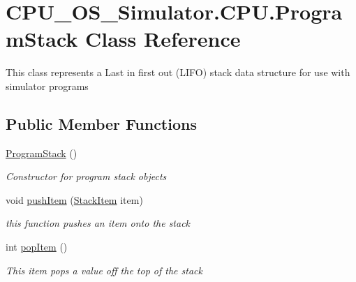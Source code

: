 \hypertarget{class_c_p_u___o_s___simulator_1_1_c_p_u_1_1_program_stack}{}\section{C\+P\+U\+\_\+\+O\+S\+\_\+\+Simulator.\+C\+P\+U.\+Program\+Stack Class Reference}
\label{class_c_p_u___o_s___simulator_1_1_c_p_u_1_1_program_stack}


This class represents a Last in first out (L\+I\+F\+O) stack data structure for use with simulator programs  


\subsection*{Public Member Functions}
\begin{DoxyCompactItemize}
\item 
\hyperlink{class_c_p_u___o_s___simulator_1_1_c_p_u_1_1_program_stack_a2a30dfbb7df3408de94c883c44aff090}{Program\+Stack} ()
\begin{DoxyCompactList}\small\item\em Constructor for program stack objects \end{DoxyCompactList}\item 
void \hyperlink{class_c_p_u___o_s___simulator_1_1_c_p_u_1_1_program_stack_ae52c8a15274b2e86e02572ba13cad60c}{push\+Item} (\hyperlink{class_c_p_u___o_s___simulator_1_1_c_p_u_1_1_stack_item}{Stack\+Item} item)
\begin{DoxyCompactList}\small\item\em this function pushes an item onto the stack \end{DoxyCompactList}\item 
int \hyperlink{class_c_p_u___o_s___simulator_1_1_c_p_u_1_1_program_stack_a32a272fedcd1d8ac5673b3ef90689519}{pop\+Item} ()
\begin{DoxyCompactList}\small\item\em This item pops a value off the top of the stack \end{DoxyCompactList}\end{DoxyCompactItemize}
